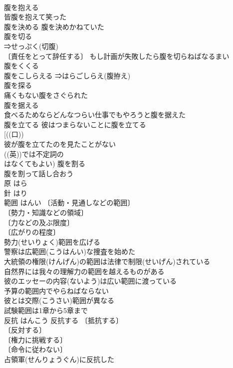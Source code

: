 \documentclass[8pt]{extreport}
\begin{document}
\begin{CJK}{UTF8}{min}
\\	腹を抱える　
\\	皆腹を抱えて笑った 
\\	腹を決める 腹を決めかねていた 
\\	腹を切る 
\\	⇒せっぷく(切腹) 
\\	〔責任をとって辞任する〕 もし計画が失敗したら腹を切らねばなるまい 
\\	腹をくくる 
\\	腹をこしらえる ⇒はらごしらえ(腹拵え)　 
\\	腹を探る 
\\	痛くもない腹をさぐられた 
\\	腹を据える　
\\	食べるためならどんなつらい仕事でもやろうと腹を据えた 
\\	腹を立てる 彼はつまらないことに腹を立てる 
\\	[((口))
\\	彼が腹を立てたのを見たことがない 
\\	((英))では不定詞の
\\	はなくてもよい) 腹を割る　 
\\	腹を割って話し合おう 
\\	原	はら	
\\	針	はり	
\\	範囲	はんい	〔活動・見通しなどの範囲〕
\\	〔勢力・知識などの領域〕
\\	〔力などの及ぶ限度〕
\\	〔広がりの程度〕
\\	勢力(せいりょく)範囲を広げる 
\\	警察は広範囲(こうはんい)な捜査を始めた 
\\	大統領の権限(けんげん)の範囲は法律で制限(せいげん)されている 
\\	自然界には我々の理解力の範囲を越えるものがある 
\\	彼のエッセーの内容(ないよう)は広い範囲に渡っている 
\\	予算の範囲内でやらねばならない 
\\	彼とは交際(こうさい)範囲が異なる 
\\	試験範囲は1章から5章まで 
\\	反抗	はんこう	反抗する 〔抵抗する〕
\\	〔反対する〕
\\	〔権力に挑戦する〕
\\	〔命令に従わない〕
\\	占領軍(せんりょうぐん)に反抗した 

\end{CJK}
\end{document}
